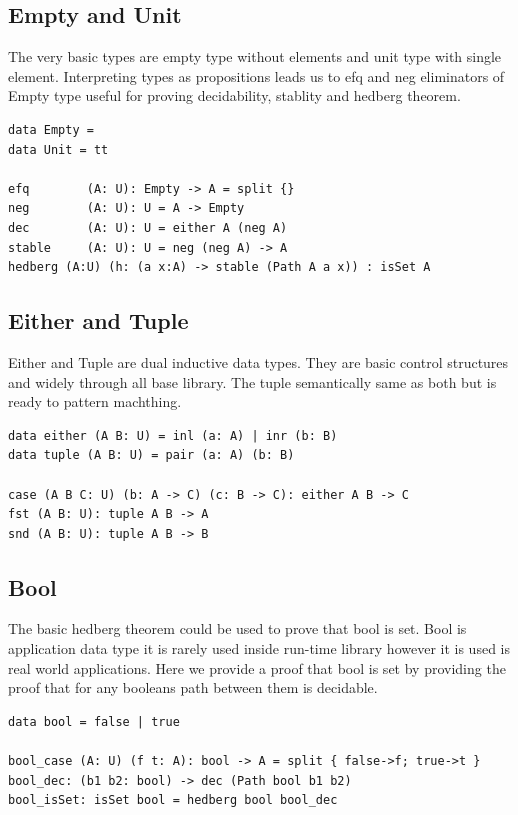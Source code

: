 \documentclass{article}
\begin{document}
\subsection{Empty and Unit}

The very basic types are empty type without elements and unit type with single element.
Interpreting types as propositions leads us to efq and neg eliminators of Empty type useful
for proving decidability, stablity and hedberg theorem.

\begin{lstlisting}[mathescape=true]
data Empty =
data Unit = tt

efq        (A: U): Empty -> A = split {}
neg        (A: U): U = A -> Empty
dec        (A: U): U = either A (neg A)
stable     (A: U): U = neg (neg A) -> A
hedberg (A:U) (h: (a x:A) -> stable (Path A a x)) : isSet A
\end{lstlisting}

\subsection{Either and Tuple}

Either and Tuple are dual inductive data types.
They are  basic control structures and widely through all base library.
The tuple semantically same as both but is ready to pattern machthing.

\begin{lstlisting}[mathescape=true]
data either (A B: U) = inl (a: A) | inr (b: B)
data tuple (A B: U) = pair (a: A) (b: B)

case (A B C: U) (b: A -> C) (c: B -> C): either A B -> C
fst (A B: U): tuple A B -> A
snd (A B: U): tuple A B -> B
\end{lstlisting}

\subsection{Bool}

The basic hedberg theorem could be used to prove that bool is set.
Bool is application data type it is rarely used inside run-time library
however it is used is real world applications. Here we provide a proof
that bool is set by providing the proof that for any booleans path
between them is decidable.

\begin{lstlisting}[mathescape=true]
data bool = false | true

bool_case (A: U) (f t: A): bool -> A = split { false->f; true->t }
bool_dec: (b1 b2: bool) -> dec (Path bool b1 b2)
bool_isSet: isSet bool = hedberg bool bool_dec
\end{lstlisting}
\end{document}
